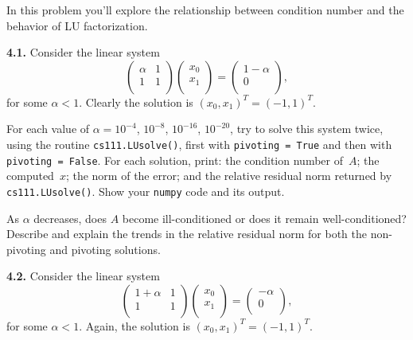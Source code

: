 \documentclass[11pt]{article}
\begin{document}
In this problem you'll explore the relationship between condition number and
the behavior of LU factorization. 

\par\medskip
\newpage
{\bf 4.1.} 
Consider the linear system
$$
   \left(
   \begin{array}{cc}
      \alpha & 1 \\ 	
           1 & 1 \\ 	
   \end{array} \right)
   \left(
   \begin{array}{c}
      x_0 \\ 	
      x_1 \\ 	
   \end{array} \right)
   =
   \left(
   \begin{array}{cc}
      1 - \alpha \\ 	
               0 \\ 	
   \end{array} \right),
$$
for some $\alpha < 1$.
Clearly the solution is $(x_0, x_1)^T = (-1,1)^T$.

For each value of $\alpha = 10^{-4}$, $10^{-8}$, $10^{-16}$, $10^{-20}$,
try to solve this system twice, using the routine {\tt cs111.LUsolve()},
first with {\tt pivoting = True} and then with {\tt pivoting = False}.
For each solution, print: 
the condition number of~$A$;
the computed~$x$; the norm of the error; 
and the relative residual norm returned by {\tt cs111.LUsolve()}.
Show your {\tt numpy} code and its output.

As $\alpha$ decreases, does $A$ become ill-conditioned or does it remain well-conditioned?
Describe and explain the trends in the relative residual norm
for both the non-pivoting and pivoting solutions.

\par\medskip
{\bf 4.2.} 
Consider the linear system
$$
   \left(
   \begin{array}{cc}
      1 + \alpha & 1 \\ 	
               1 & 1 \\ 	
   \end{array} \right)
   \left(
   \begin{array}{c}
      x_0 \\ 	
      x_1 \\ 	
   \end{array} \right)
   =
   \left(
   \begin{array}{cc}
      -\alpha \\ 	
            0 \\ 	
   \end{array} \right),
$$
for some $\alpha < 1$.
Again, the solution is $(x_0, x_1)^T = (-1,1)^T$.
\end{document}
